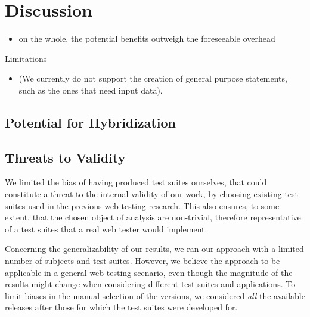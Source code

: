 \section{Discussion}\label{sec:discussion} 

\begin{itemize}
\item on the whole, the potential benefits outweigh the foreseeable overhead
\end{itemize}

Limitations
\begin{itemize}
\item (We currently do not support the creation of general purpose statements, such as the ones that need input data).
\end{itemize}

\subsection{Potential for Hybridization} 

\subsection{Threats to Validity}\label{sec:ttv}

 We limited the bias of having produced test suites ourselves, that could constitute a threat to the internal validity of our work, by choosing existing test suites used in the previous web testing research. This also ensures, to some extent, that the chosen object of analysis are non-trivial, therefore representative of a test suites that a real web tester would implement. 

 Concerning the generalizability of our results, we ran our approach with a limited number of subjects and test suites. However, we believe the approach to be applicable in a general web testing scenario, even though the magnitude of the results might change when considering different test suites and applications. To limit biases in the manual selection of the versions, we considered \textit{all} the available releases after those for which the test suites were developed for.